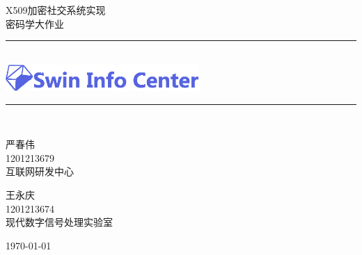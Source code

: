 \documentclass[a4paper]{ctexart}
\author{严春伟\\
    互联网研发中心\\
    1201213679
\and 王永庆\\
    嵌入式实验室\\
    xxxx
}
\newcommand{\HRule}{\rule{\linewidth}{0.5mm}}
\begin{document}
\begin{titlepage}
    \begin{center}
    \textsc{\LARGE X509加密社交系统实现}\\[1.5cm]
    \textsc{\Large 密码学大作业}\\[4.5cm]
    \HRule \\[0.4cm]
    \includegraphics[width=0.55\textwidth]{./logo}\\
    \HRule \\[2.5cm]
    \begin{minipage}{0.4\textwidth}
        \begin{flushleft} \large
            \begin{center}
            严春伟\\
            1201213679\\
            互联网研发中心
            \end{center}
        \end{flushleft}
    \end{minipage}
    \begin{minipage}{0.4\textwidth}
        \begin{flushright} \large
            \begin{center}
                王永庆\\
                1201213674\\
                现代数字信号处理实验室
            \end{center}
        \end{flushright}
    \end{minipage}

    \vfill

    {\large \today}
    \end{center}
\end{titlepage}
\end{document}
